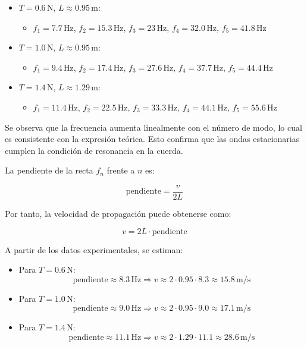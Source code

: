 \documentclass{article}
\begin{document}
\begin{itemize}
    \item $T = 0.6\,\text{N}$, $L \approx 0.95\,\text{m}$:
    \begin{itemize}
        \item $f_1 = 7.7\,\text{Hz}$, $f_2 = 15.3\,\text{Hz}$, $f_3 = 23\,\text{Hz}$, $f_4 = 32.0\,\text{Hz}$, $f_5 = 41.8\,\text{Hz}$
    \end{itemize}
    
    \item $T = 1.0\,\text{N}$, $L \approx 0.95\,\text{m}$:
    \begin{itemize}
        \item $f_1 = 9.4\,\text{Hz}$, $f_2 = 17.4\,\text{Hz}$, $f_3 = 27.6\,\text{Hz}$, $f_4 = 37.7\,\text{Hz}$, $f_5 = 44.4\,\text{Hz}$
    \end{itemize}
    
    \item $T = 1.4\,\text{N}$, $L \approx 1.29\,\text{m}$:
    \begin{itemize}
        \item $f_1 = 11.4\,\text{Hz}$, $f_2 = 22.5\,\text{Hz}$, $f_3 = 33.3\,\text{Hz}$, $f_4 = 44.1\,\text{Hz}$, $f_5 = 55.6\,\text{Hz}$
    \end{itemize}
\end{itemize}

Se observa que la frecuencia aumenta linealmente con el número de modo, lo cual es consistente con la expresión teórica. Esto confirma que las ondas estacionarias cumplen la condición de resonancia en la cuerda.

La pendiente de la recta $f_n$ frente a $n$ es:

\[
\text{pendiente} = \frac{v}{2L}
\]

Por tanto, la velocidad de propagación puede obtenerse como:

\[
v = 2L \cdot \text{pendiente}
\]

A partir de los datos experimentales, se estiman:

\begin{itemize}
    \item Para $T = 0.6\,\text{N}$:
    \[
    \text{pendiente} \approx 8.3\,\text{Hz} \Rightarrow v \approx 2 \cdot 0.95 \cdot 8.3 \approx 15.8\,\text{m/s}
    \]

    \item Para $T = 1.0\,\text{N}$:
    \[
    \text{pendiente} \approx 9.0\,\text{Hz} \Rightarrow v \approx 2 \cdot 0.95 \cdot 9.0 \approx 17.1\,\text{m/s}
    \]

    \item Para $T = 1.4\,\text{N}$:
    \[
    \text{pendiente} \approx 11.1\,\text{Hz} \Rightarrow v \approx 2 \cdot 1.29 \cdot 11.1 \approx 28.6\,\text{m/s}
    \]
\end{itemize}
\end{document}

